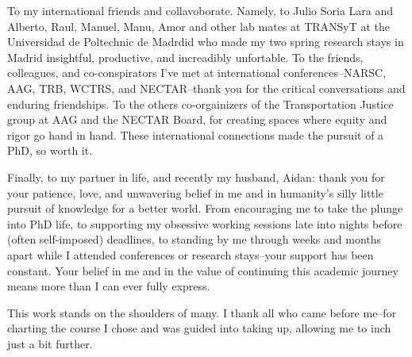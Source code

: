 \documentclass[
11pt, %
oneside, %
english, %
singlespacing, %
]{macthesis} %
\def\blankpage{%
      \clearpage%
      \thispagestyle{empty}%
      \addtocounter{page}{-1}%
      \null%
      \clearpage}
\begin{document}
\begin{acknowledgements}
    To my international friends and collavoborate. Namely, to Julio Soria Lara and Alberto, Raul, Manuel, Manu, Amor and other lab mates at TRANSyT at the Universidad de Poltechnic de Madrdid who made my two spring research stays in Madrid insightful, productive, and increadibly unfortable. To the friends, colleagues, and co-conspirators I've met at international conferences--NARSC, AAG, TRB, WCTRS, and NECTAR--thank you for the critical conversations and enduring friendships. To the others co-orgainizers of the Transportation Justice group at AAG and the NECTAR Board, for creating spaces where equity and rigor go hand in hand. These international connections made the pursuit of a PhD, so worth it.

    Finally, to my partner in life, and recently my husband, Aidan: thank you for your patience, love, and unwavering belief in me and in humanity's silly little pursuit of knowledge for a better world. From encouraging me to take the plunge into PhD life, to supporting my obsessive working sessions late into nights before (often self-imposed) deadlines, to standing by me through weeks and months apart while I attended conferences or research stays--your support has been constant. Your belief in me and in the value of continuing this academic journey means more than I can ever fully express.

    This work stands on the shoulders of many. I thank all who came before me--for charting the course I chose and was guided into taking up, allowing me to inch just a bit further.
  \end{acknowledgements}
\blankpage
\clearpage


\tableofcontents %

\listoffigures %

\listoftables %

\end{document}
